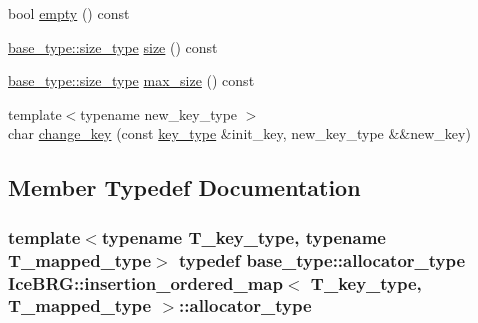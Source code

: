 \begin{DoxyCompactItemize}
\item 
bool \hyperlink{classIceBRG_1_1insertion__ordered__map_aa7d7a107137c30963714a3759fe29ccb}{empty} () const 
\item 
\hyperlink{lib_2IceBRG__main_2common_8h_a566c61f2ca17211f4ba8557f3f65e8d3}{base\+\_\+type\+::size\+\_\+type} \hyperlink{classIceBRG_1_1insertion__ordered__map_a08ee5071a2b00333968c93e7b232d2a1}{size} () const 
\item 
\hyperlink{lib_2IceBRG__main_2common_8h_a566c61f2ca17211f4ba8557f3f65e8d3}{base\+\_\+type\+::size\+\_\+type} \hyperlink{classIceBRG_1_1insertion__ordered__map_a3c0c4b8b24877398dc27421bcce3f48d}{max\+\_\+size} () const 
\item 
{\footnotesize template$<$typename new\+\_\+key\+\_\+type $>$ }\\char \hyperlink{classIceBRG_1_1insertion__ordered__map_a7ffb4a518ffdc66281691d94ee75de23}{change\+\_\+key} (const \hyperlink{classIceBRG_1_1insertion__ordered__map_a89f1c1aa5a0c6d1a681a0957092bb738}{key\+\_\+type} \&init\+\_\+key, new\+\_\+key\+\_\+type \&\&new\+\_\+key)
\end{DoxyCompactItemize}


\subsection{Member Typedef Documentation}
\hypertarget{classIceBRG_1_1insertion__ordered__map_affacbb9577d346f764974b169f73e762}{}
\subsubsection[{allocator\+\_\+type}]{\setlength{\rightskip}{0pt plus 5cm}template$<$typename T\+\_\+key\+\_\+type, typename T\+\_\+mapped\+\_\+type$>$ typedef base\+\_\+type\+::allocator\+\_\+type {\bf Ice\+B\+R\+G\+::insertion\+\_\+ordered\+\_\+map}$<$ T\+\_\+key\+\_\+type, T\+\_\+mapped\+\_\+type $>$\+::{\bf allocator\+\_\+type}}\label{classIceBRG_1_1insertion__ordered__map_affacbb9577d346f764974b169f73e762}
\hypertarget{classIceBRG_1_1insertion__ordered__map_afac747acefbbac2509113178f93cee10}{}
